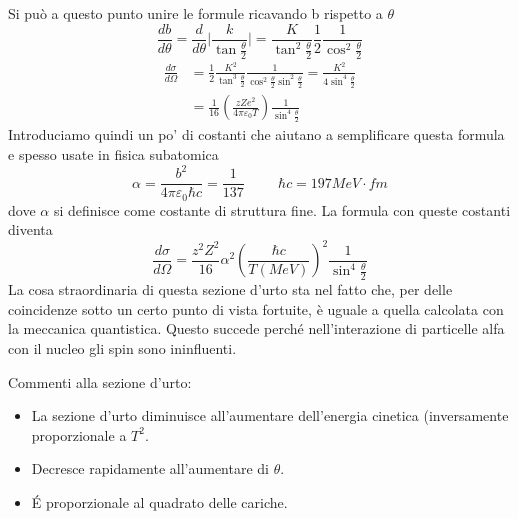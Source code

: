 Si può a questo punto unire le formule ricavando b rispetto a $\theta$ 
\begin{equation}
\frac{db}{d\theta}=\frac{d}{d\theta}\biggl|\frac{k}{\tan\frac{\theta}{2}}\biggl|=\frac{K}{\tan^2 \frac{\theta}{2}}\frac{1}{2}\frac{1}{\cos^2\frac{\theta}{2}}
\end{equation}
\begin{equation}
\begin{split}
\frac{d\sigma}{d\Omega}&=\frac{1}{2}\frac{K^2}{\tan^3 \frac{\theta}{2}}\frac{1}{\cos^2\frac{\theta}{2}\sin^2\frac{\theta}{2}}=\frac{K^2}{4\sin^4\frac{\theta}{2}}\\
&=\frac{1}{16}\left(\frac{zZe^2}{4\pi\varepsilon_0 T}\right)\frac{1}{\sin^4\frac{\theta}{2}}
\end{split}
\end{equation}
Introduciamo quindi un po' di costanti che aiutano a semplificare questa formula e spesso usate in fisica subatomica
\begin{equation}
\alpha=\frac{b^2}{4\pi\varepsilon_0\hbar c}=\frac{1}{137}\hspace{1cm}\hbar c=197 MeV\cdot fm
\end{equation}
dove $\alpha$ si definisce come costante di struttura fine. 
La formula con queste costanti diventa
\begin{equation}
\frac{d\sigma}{d\Omega}=\frac{z^2Z^2}{16}\alpha^2\left(\frac{\hbar c}{T(MeV)}\right)^2 \frac{1}{\sin^4\frac{\theta}{2}}
\end{equation}
La cosa straordinaria di questa sezione d'urto sta nel fatto che, per delle coincidenze sotto un certo punto di vista fortuite, è uguale a quella calcolata con la meccanica quantistica. Questo succede perché nell'interazione di particelle alfa con il nucleo gli spin sono ininfluenti. 

Commenti alla sezione d'urto:
\begin{itemize}
\item La sezione d'urto diminuisce all'aumentare dell'energia cinetica (inversamente proporzionale a $T^2$.
\item Decresce rapidamente all'aumentare di $\theta$.
\item \'E proporzionale al quadrato delle cariche.
\end{itemize}


